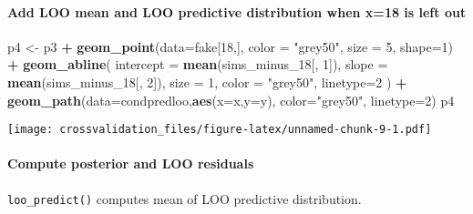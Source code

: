 \documentclass[
]{article}
\newenvironment{Shaded}{\begin{snugshade}}{\end{snugshade}}
\newcommand{\DataTypeTok}[1]{\textcolor[rgb]{0.13,0.29,0.53}{#1}}
\newcommand{\DecValTok}[1]{\textcolor[rgb]{0.00,0.00,0.81}{#1}}
\newcommand{\KeywordTok}[1]{\textcolor[rgb]{0.13,0.29,0.53}{\textbf{#1}}}
\newcommand{\NormalTok}[1]{#1}
\newcommand{\OperatorTok}[1]{\textcolor[rgb]{0.81,0.36,0.00}{\textbf{#1}}}
\newcommand{\StringTok}[1]{\textcolor[rgb]{0.31,0.60,0.02}{#1}}
\begin{document}
\hypertarget{add-loo-mean-and-loo-predictive-distribution-when-x18-is-left-out}{%
\paragraph{Add LOO mean and LOO predictive distribution when x=18 is
left
out}\label{add-loo-mean-and-loo-predictive-distribution-when-x18-is-left-out}}

\begin{Shaded}
\begin{Highlighting}[]
\NormalTok{p4 <-}\StringTok{ }\NormalTok{p3 }\OperatorTok{+}
\StringTok{  }\KeywordTok{geom_point}\NormalTok{(}\DataTypeTok{data=}\NormalTok{fake[}\DecValTok{18}\NormalTok{,], }\DataTypeTok{color =} \StringTok{"grey50"}\NormalTok{, }\DataTypeTok{size =} \DecValTok{5}\NormalTok{, }\DataTypeTok{shape=}\DecValTok{1}\NormalTok{) }\OperatorTok{+}
\StringTok{  }\KeywordTok{geom_abline}\NormalTok{(}
    \DataTypeTok{intercept =} \KeywordTok{mean}\NormalTok{(sims_minus_}\DecValTok{18}\NormalTok{[, }\DecValTok{1}\NormalTok{]),}
    \DataTypeTok{slope =} \KeywordTok{mean}\NormalTok{(sims_minus_}\DecValTok{18}\NormalTok{[, }\DecValTok{2}\NormalTok{]),}
    \DataTypeTok{size =} \DecValTok{1}\NormalTok{,}
    \DataTypeTok{color =} \StringTok{"grey50"}\NormalTok{,}
    \DataTypeTok{linetype=}\DecValTok{2}
\NormalTok{  ) }\OperatorTok{+}
\StringTok{  }\KeywordTok{geom_path}\NormalTok{(}\DataTypeTok{data=}\NormalTok{condpredloo,}\KeywordTok{aes}\NormalTok{(}\DataTypeTok{x=}\NormalTok{x,}\DataTypeTok{y=}\NormalTok{y), }\DataTypeTok{color=}\StringTok{"grey50"}\NormalTok{, }\DataTypeTok{linetype=}\DecValTok{2}\NormalTok{)}
\NormalTok{p4}
\end{Highlighting}
\end{Shaded}

\texttt{[image: crossvalidation\_files/figure-latex/unnamed-chunk-9-1.pdf]}

\hypertarget{compute-posterior-and-loo-residuals}{%
\paragraph{Compute posterior and LOO
residuals}\label{compute-posterior-and-loo-residuals}}

\texttt{loo\_predict()} computes mean of LOO predictive distribution.

\begin{Shaded}
\end{Shaded}
\end{document}
